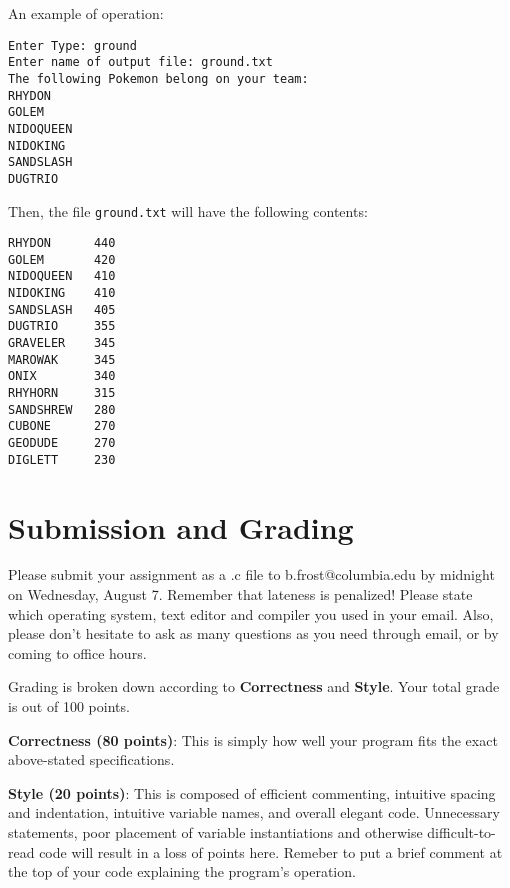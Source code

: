 \documentclass{article}
\begin{document}
An example of operation:
\begin{verbatim}
Enter Type: ground
Enter name of output file: ground.txt
The following Pokemon belong on your team:
RHYDON
GOLEM
NIDOQUEEN
NIDOKING
SANDSLASH
DUGTRIO
\end{verbatim}

Then, the file \texttt{ground.txt} will have the following contents:
\begin{verbatim}
RHYDON      440
GOLEM       420
NIDOQUEEN   410
NIDOKING    410
SANDSLASH   405
DUGTRIO     355
GRAVELER    345
MAROWAK     345
ONIX        340
RHYHORN     315
SANDSHREW   280
CUBONE      270
GEODUDE     270
DIGLETT     230
\end{verbatim}

\section*{Submission and Grading}
Please submit your assignment as a .c file to b.frost@columbia.edu by midnight on Wednesday, August 7. Remember that lateness is penalized! Please state which operating system, text editor and compiler you used in your email. Also, please don't hesitate to ask as many questions as you need through email, or by coming to office hours.

Grading is broken down according to \textbf{Correctness} and \textbf{Style}. Your total grade is out of 100 points.

\noindent\textbf{Correctness (80 points)}: This is simply how well your program fits the exact above-stated specifications.

\noindent\textbf{Style (20 points)}: This is composed of efficient commenting, intuitive spacing and indentation, intuitive variable names, and overall elegant code. Unnecessary statements, poor placement of variable instantiations and otherwise difficult-to-read code will result in a loss of points here. Remeber to put a brief comment at the top of your code explaining the program's operation.
\end{document}
